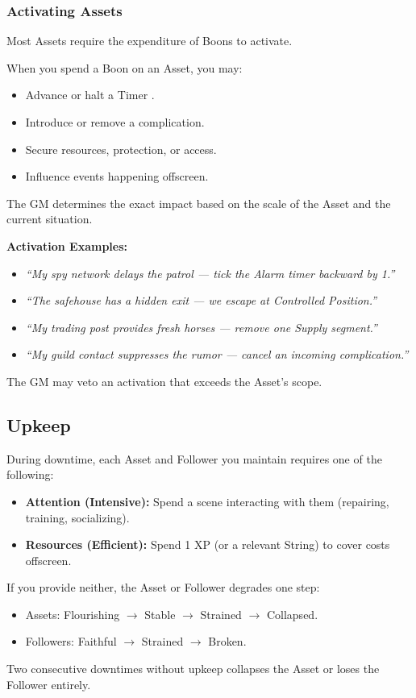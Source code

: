 \subsubsection{Activating Assets}
Most Assets require the expenditure of Boons to activate.

When you spend a Boon on an Asset, you may:
\begin{itemize}
  \item Advance or halt a Timer .
  \item Introduce or remove a complication.
  \item Secure resources, protection, or access.
  \item Influence events happening offscreen.
\end{itemize}
The GM determines the exact impact based on the scale of the Asset and the current situation.

\textbf{Activation Examples:}
\begin{itemize}
  \item \textit{``My spy network delays the patrol --- tick the Alarm timer backward by 1.''}
  \item \textit{``The safehouse has a hidden exit --- we escape at Controlled Position.''}
  \item \textit{``My trading post provides fresh horses --- remove one Supply segment.''}
  \item \textit{``My guild contact suppresses the rumor --- cancel an incoming complication.''}
\end{itemize}
The GM may veto an activation that exceeds the Asset's scope.

\subsection{Upkeep}

During downtime, each Asset and Follower you maintain requires one of the following:
\begin{itemize}
  \item \textbf{Attention (Intensive):} Spend a scene interacting with them (repairing, training, socializing).
  \item \textbf{Resources (Efficient):} Spend 1 XP (or a relevant String) to cover costs offscreen.
\end{itemize}
If you provide neither, the Asset or Follower degrades one step:
\begin{itemize}
  \item Assets: Flourishing $\rightarrow$ Stable $\rightarrow$ Strained $\rightarrow$ Collapsed.
  \item Followers: Faithful $\rightarrow$ Strained $\rightarrow$ Broken.
\end{itemize}
Two consecutive downtimes without upkeep collapses the Asset or loses the Follower entirely.

